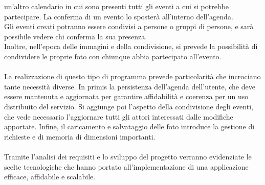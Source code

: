 un'altro calendario in cui sono presenti tutti gli eventi a cui si potrebbe partecipare. 
La conferma di un evento lo sposterà all'interno dell'agenda.\\
Gli eventi creati potranno essere condivisi a persone o gruppi di persone, e sarà possibile vedere chi conferma la sua presenza.\\
Inoltre, nell'epoca delle immagini e della condivisione, si prevede la possibilità di condividere le proprie foto con chiunque abbia partecipato all'evento.\\
\\
La realizzazione di questo tipo di programma prevede particolarità che incrociano tante necessità diverse.
In primis la persistenza dell'agenda dell'utente, che deve essere mantenuta e aggiornata per garantire affidabilità e coerenza per un uso distribuito del servizio.
Si aggiunge poi l'aspetto della condivisione degli eventi, che vede necessario l'aggiornare tutti gli attori interessati dalle modifiche apportate.
Infine, il caricamento e salvataggio delle foto introduce la gestione di richieste e di memoria di dimensioni importanti.\\
\\
Tramite l'analisi dei requisiti e lo sviluppo del progetto verranno evidenziate le scelte tecnologiche che hanno portato all'implementazione di una applicazione efficace, affidabile e scalabile.  


\newpage